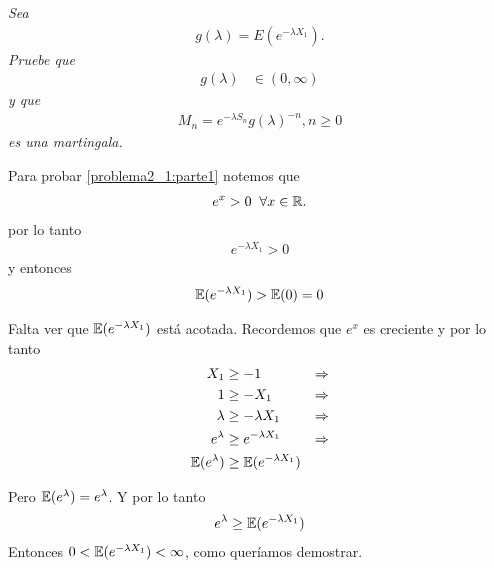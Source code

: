 \emph{
    Sea
        \begin{align}
                g(\lambda)=E(e^{- \lambda X_1}).
        \end{align} 
    Pruebe que 
        \begin{align}
                g(\lambda)    &\in (0,\infty)\label{problema2_1:parte1}
        \end{align}        
    y que
        \begin{align}
                M_n=e^{-\lambda S_n}g(\lambda)^{-n},n\geq 0
        \end{align}
    es una martingala.\\
}
    
    Para probar \eqref{problema2_1:parte1} notemos que
    \begin{align}
        e^x > 0 \;\; \forall x \in \mathbb{R}.
    \end{align}
    por lo tanto
    \begin{align}
        e^{-\lambda X_1} > 0
    \end{align}
    y entonces
    \begin{align}
        \mathbb{E}(e^{-\lambda X_1}) >\mathbb{E}(0) = 0
    \end{align}

    Falta ver que $\mathbb{E}(e^{-\lambda X_1})$ está acotada. Recordemos que $e^x$ es creciente y por lo tanto
    \begin{align}
            X_1                &\geq     -1                       & \Rightarrow\\
            1                  &\geq     - X_1                    & \Rightarrow\\
            \lambda            &\geq     - \lambda X_1            & \Rightarrow\\
            e^{\lambda}        &\geq     e^{- \lambda X_1}        & \Rightarrow\\
            \mathbb{E}(e^{\lambda})    &\geq     \mathbb{E}(e^{- \lambda X_1})
    \end{align}
    
    Pero $\mathbb{E}(e^{\lambda}) = e^{\lambda}$. Y por lo tanto
    \begin{align}
        e^{\lambda} \geq  \mathbb{E}(e^{- \lambda X_1})
    \end{align}    
    Entonces $0 < \mathbb{E}(e^{-\lambda X_1}) < \infty$, como queríamos demostrar.
